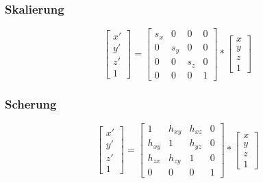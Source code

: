 \documentclass[10pt]{article}
\begin{document}
\subsubsection{Skalierung}
\begin{equation}
\begin{bmatrix} x' \\ y' \\ z'\\ 1\end{bmatrix}
= \begin{bmatrix}
s_x & 0 & 0 & 0\\
0 & s_y & 0 & 0 \\
0 & 0 & s_z & 0 \\
0 & 0 & 0 & 1
\end{bmatrix} * \begin{bmatrix} x \\ y  \\ z\\ 1\end{bmatrix}\end{equation}
\subsubsection{Scherung}
\begin{equation}
\begin{bmatrix} x' \\ y' \\ z'\\ 1\end{bmatrix}
= \begin{bmatrix}
1 & h_{xy} & h_{xz} & 0\\
h_{xy} & 1 & h_{yz} & 0\\
h_{zx} & h_{zy} & 1 & 0\\
0 & 0 & 0 & 1
\end{bmatrix} * \begin{bmatrix} x \\ y  \\ z\\ 1\end{bmatrix}\end{equation}
\end{document}
